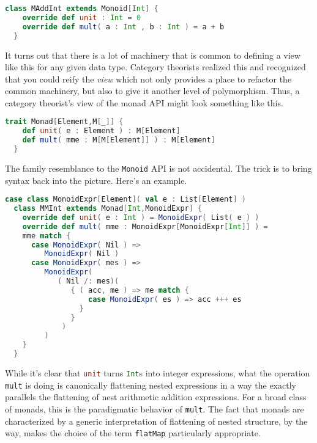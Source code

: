 \begin{lstlisting}[language=Scala]
  class MAddInt extends Monoid[Int] {
    override def unit : Int = 0
    override def mult( a : Int , b : Int ) = a + b
  }
\end{lstlisting}

It turns out that there is a lot of machinery that is common to
defining a view like this for any given data type. Category theorists
realized this and recognized that you could reify the \emph{view}
which not only provides a place to refactor the common machinery, but
also to give it another level of polymorphism. Thus, a category
theorist's view of the monad API might look something like this.

\begin{lstlisting}[language=Scala]
  trait Monad[Element,M[_]] {
    def unit( e : Element ) : M[Element]
    def mult( mme : M[M[Element]] ) : M[Element] 
  }
\end{lstlisting}

The family resemblance to the \lstinline[language=Scala]!Monoid! API
is not accidental. The trick is to bring syntax back into the picture. Here's an example.

\begin{lstlisting}[language=Scala]
  case class MonoidExpr[Element]( val e : List[Element] )
  class MMInt extends Monad[Int,MonoidExpr] {
    override def unit( e : Int ) = MonoidExpr( List( e ) )
    override def mult( mme : MonoidExpr[MonoidExpr[Int]] ) =
    mme match {
      case MonoidExpr( Nil ) =>
         MonoidExpr( Nil )
      case MonoidExpr( mes ) => 
         MonoidExpr(
            ( Nil /: mes)( 
               { ( acc, me ) => me match { 
                   case MonoidExpr( es ) => acc +++ es 
                 } 
               } 
             )
         )
    }
  }
\end{lstlisting}

While it's clear that \lstinline[language=Scala]!unit! turns
\lstinline[language=Scala]!Int!s into integer expressions, what the
operation \lstinline[language=Scala]!mult! is doing is canonically
flattening nested expressions in a way the exactly parallels the
flattening of nest arithmetic addition expressions. For a broad class
of monads, this is the paradigmatic behavior of
\lstinline[language=Scala]!mult!. The fact that monads are
characterized by a generic interpretation of flattening of nested
structure, by the way, makes the choice of the term
\lstinline[language=Scala]!flatMap! particularly appropriate.

